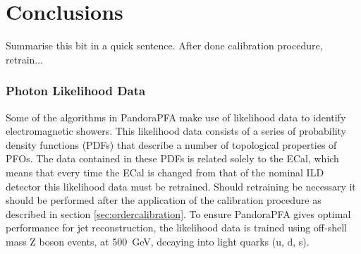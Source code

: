 
\section{Conclusions}
Summarise this bit in a quick sentence.  After done calibration procedure, retrain...

\subsubsection{Photon Likelihood Data}
Some of the algorithms in PandoraPFA make use of likelihood data to identify electromagnetic showers.  This likelihood data consists of a series of probability density functions (PDFs) that describe a number of topological properties of PFOs.  The data contained in these PDFs is related solely to the ECal, which means that every time the ECal is changed from that of the nominal ILD detector this likelihood data must be retrained.  Should retraining be necessary it should be performed after the application of the calibration procedure as described in section \ref{sec:ordercalibration}.  To ensure PandoraPFA gives optimal performance for jet reconstruction, the likelihood data is trained using off-shell mass Z boson events, at 500~GeV, decaying into light quarks (u, d, s).  
